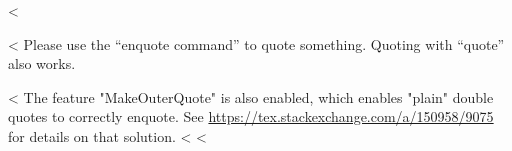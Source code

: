 <%

<%
Please use the \enquote{enquote command} to quote something.
Quoting with "`quote"' also works.

<%
The feature "MakeOuterQuote" is also enabled, which enables "plain" double quotes to correctly enquote.
See \url{https://tex.stackexchange.com/a/150958/9075} for details on that solution.
<%
<%
